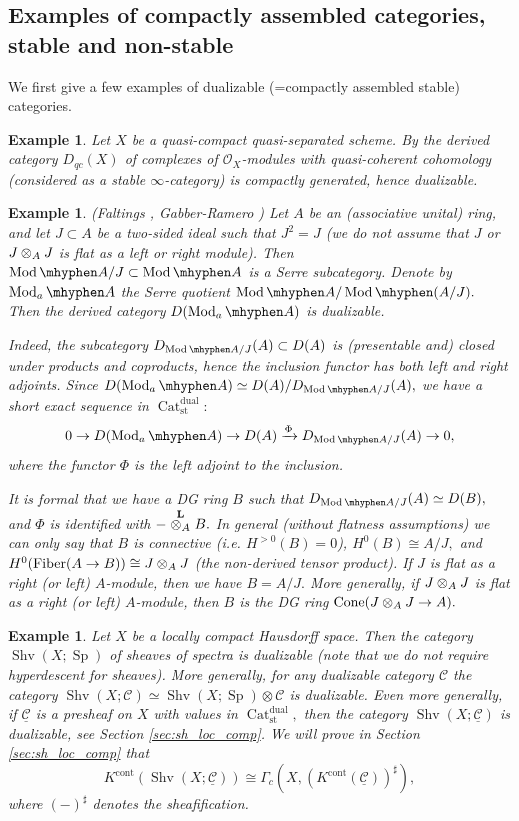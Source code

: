 \documentclass[11pt,leqno]{amsart}
\newtheorem{example}[theo]{Example}
\numberwithin{equation}{section}
\def\bL{\mathbb{L}}
\def\bL{{\mathbf L}}
\newcommand{\tens}[1]{%
  \mathbin{\mathop{\otimes}\displaylimits_{#1}}%
}
\newcommand{\hy}{\mhyphen}
\newcommand{\xto}{\xrightarrow}
\newcommand{\Cat}{\operatorname{Cat}}
\newcommand{\Cone}{\operatorname{Cone}}
\newcommand{\Fiber}{\operatorname{Fiber}}
\newcommand{\cont}{\operatorname{cont}}
\newcommand{\st}{\operatorname{st}}
\newcommand{\dual}{\operatorname{dual}}
\newcommand{\cO}{{\mathcal O}}
\newcommand{\cC}{{\mathcal C}}
\newcommand{\un}{\underline}
\newcommand{\Sh}{\operatorname{Shv}}
\newcommand{\Sp}{\operatorname{Sp}}
\newcommand{\Mod}{\operatorname{Mod}}
\begin{document}
\subsection{Examples of compactly assembled categories, stable and non-stable} 
\label{ssec:examples}

We first give a few examples of dualizable (=compactly assembled stable) categories. 

\begin{example}Let $X$ be a quasi-compact quasi-separated scheme. By \cite[Theorem 3.1.1]{BVdB03} the derived category $D_{qc}(X)$ of complexes of $\cO_X$-modules with quasi-coherent cohomology (considered as a stable $\infty$-category) is compactly generated, hence dualizable.\end{example}

\begin{example}(Faltings \cite{Fa02}, Gabber-Ramero \cite{GR03}) Let $A$ be an (associative unital) ring, and let $J\subset A$ be a two-sided ideal such that $J^2=J$ (we do not assume that $J$ or $J\tens{A}J$ is flat as a left or right module). Then $\Mod\hy A/J\subset\Mod\hy A$ is a Serre subcategory. Denote by $\Mod_a\hy A$ the Serre quotient $\Mod\hy A/\Mod\hy (A/J).$ Then the derived category $D(\Mod_a\hy A)$ is dualizable. 

Indeed, the subcategory $D_{\Mod\hy A/J}(A)\subset D(A)$ is (presentable and) closed under products and coproducts, hence the inclusion functor has both left and right adjoints. Since $D(\Mod_a\hy A)\simeq D(A)/D_{\Mod\hy A/J}(A),$ we have a short exact sequence in $\Cat_{\st}^{\dual}:$
\begin{equation}\label{eq:ses_for_Mod_a_general} 0\to D(\Mod_a\hy A)\to D(A)\xto{\Phi} D_{\Mod\hy A/J}(A)\to 0,\end{equation}
where the functor $\Phi$ is the left adjoint to the inclusion.

It is formal that we have a DG ring $B$ such that $D_{\Mod\hy A/J}(A)\simeq D(B),$ and $\Phi$ is identified with $-\stackrel{\bL}{\tens{A}}B.$ In general (without flatness assumptions) we can only say that $B$ is connective (i.e. $H^{>0}(B)=0$), $H^0(B)\cong A/J,$ and $H^0(\Fiber(A\to B))\cong J\tens{A}J$ (the non-derived tensor product).  If $J$ is flat as a right (or left) $A$-module, then we have $B=A/J.$ More generally, if $J\tens{A}J$ is flat as a right (or left) $A$-module, then $B$ is the DG ring $\Cone(J\tens{A}J\to A).$\end{example}

\begin{example}Let $X$ be a locally compact Hausdorff space. Then the category $\Sh(X;\Sp)$ of sheaves of spectra is dualizable (note that we do not require hyperdescent for sheaves). More generally, for any dualizable category $\cC$ the category $\Sh(X;\cC)\simeq\Sh(X;\Sp)\otimes\cC$ is dualizable. Even more generally, if $\un{\cC}$ is a presheaf on $X$ with values in $\Cat_{\st}^{\dual},$ then the category $\Sh(X;\un{\cC})$ is dualizable, see Section \ref{sec:sh_loc_comp}. We will prove in Section \ref{sec:sh_loc_comp} that $$K^{\cont}(\Sh(X;\un{\cC}))\cong \Gamma_c(X,(K^{\cont}(\un{\cC}))^{\sharp}),$$ where $(-)^{\sharp}$ denotes the sheafification.\end{example}
\end{document}
